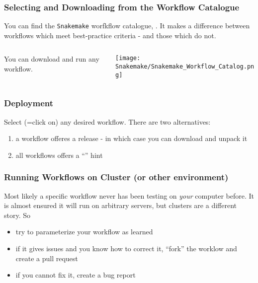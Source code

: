 \begin{frame}
 \frametitle{Selecting and Downloading from the Workflow Catalogue}
 You can find the \texttt{Snakemake} worfkflow catalogue, . It makes a difference between workflows which meet best-practice criteria - and those which do not.\newline
 \begin{columns}
   \begin{column}{0.5\textwidth}
     You can download and run any workflow. \pause\newline
   \end{column}
   \begin{column}{0.5\textwidth}
     \texttt{[image: Snakemake/Snakemake\_Workflow\_Catalog.png]}
   \end{column}
 \end{columns}
\end{frame}

\begin{frame}[fragile]
  \frametitle{Deployment}
  Select (=click on) any desired workflow. There are two alternatives:
  \begin{enumerate}
   \item a workflow offeres a release - in which case you can download and unpack it
   \item all workflows offers a ``'' hint
  \end{enumerate}
\end{frame}

\begin{frame}[fragile]
  \frametitle{Running Workflows on Cluster (or other environment)}
  Most likely a specific workflow never has been testing on \emph{your} computer before. It is almost ensured it will run on arbitrary servers, but clusters are a different story. \newline
  So
  \begin{itemize}[<+->]
   \item try to parameterize your workflow as learned
   \item if it gives issues and you know how to correct it, ``fork'' the worklow and create a pull request
   \item if you cannot fix it, create a bug report
  \end{itemize}
\end{frame}

